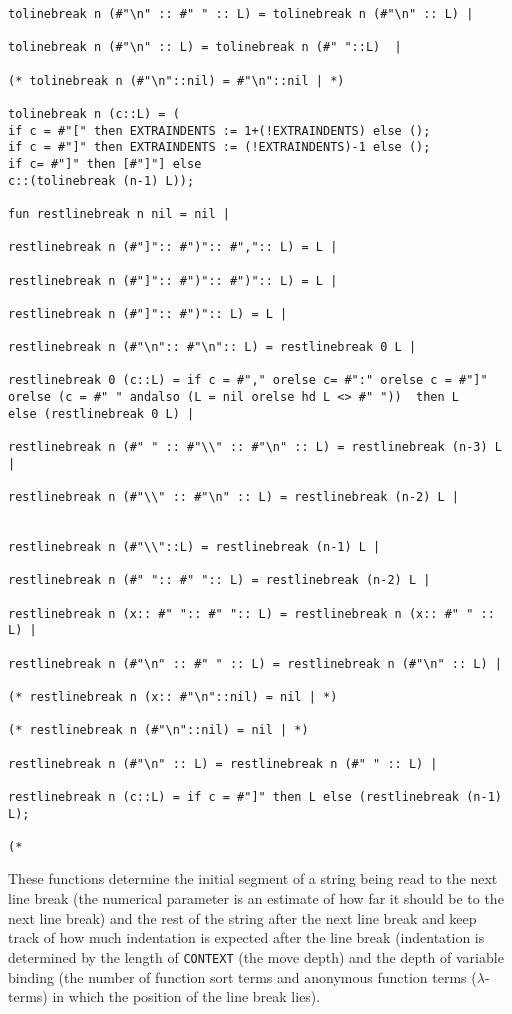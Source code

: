 \documentclass{article}
\begin{document}
\begin{verbatim}
tolinebreak n (#"\n" :: #" " :: L) = tolinebreak n (#"\n" :: L) |

tolinebreak n (#"\n" :: L) = tolinebreak n (#" "::L)  |

(* tolinebreak n (#"\n"::nil) = #"\n"::nil | *)

tolinebreak n (c::L) = (
if c = #"[" then EXTRAINDENTS := 1+(!EXTRAINDENTS) else ();
if c = #"]" then EXTRAINDENTS := (!EXTRAINDENTS)-1 else ();
if c= #"]" then [#"]"] else
c::(tolinebreak (n-1) L));

fun restlinebreak n nil = nil |

restlinebreak n (#"]":: #")":: #",":: L) = L |

restlinebreak n (#"]":: #")":: #")":: L) = L |

restlinebreak n (#"]":: #")":: L) = L |

restlinebreak n (#"\n":: #"\n":: L) = restlinebreak 0 L |

restlinebreak 0 (c::L) = if c = #"," orelse c= #":" orelse c = #"]" 
orelse (c = #" " andalso (L = nil orelse hd L <> #" "))  then L 
else (restlinebreak 0 L) |

restlinebreak n (#" " :: #"\\" :: #"\n" :: L) = restlinebreak (n-3) L |

restlinebreak n (#"\\" :: #"\n" :: L) = restlinebreak (n-2) L |


restlinebreak n (#"\\"::L) = restlinebreak (n-1) L |

restlinebreak n (#" ":: #" ":: L) = restlinebreak (n-2) L |

restlinebreak n (x:: #" ":: #" ":: L) = restlinebreak n (x:: #" " :: L) |

restlinebreak n (#"\n" :: #" " :: L) = restlinebreak n (#"\n" :: L) |

(* restlinebreak n (x:: #"\n"::nil) = nil | *)

(* restlinebreak n (#"\n"::nil) = nil | *)

restlinebreak n (#"\n" :: L) = restlinebreak n (#" " :: L) |

restlinebreak n (c::L) = if c = #"]" then L else (restlinebreak (n-1) L);

(*

\end{verbatim}

These functions determine the initial segment of a string being read to the next line break (the numerical parameter is an estimate of how far it should be to the next line break) and the rest of the string after the next line break
and keep track of how much indentation is expected after the line break (indentation is determined by the length of {\tt CONTEXT} (the move depth) and the depth of variable binding
(the number of function sort terms and anonymous function terms ($\lambda$-terms) in which the position of the line break lies).
\end{document}
